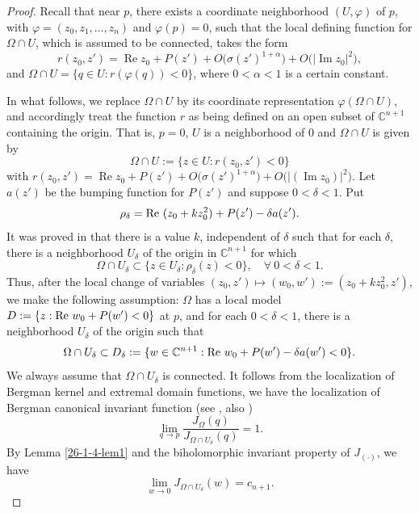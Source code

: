 \documentclass[a4paper,centertags,oneside,12pt]{amsart}
\numberwithin{equation}{section}
\begin{document}
\begin{proof}
Recall that near $p$, there exists a coordinate neighborhood $(U, \varphi)$ of $p$, with $\varphi = (z_0, z_1, \dots, z_n)$ and $\varphi(p)=0$, such that the local defining function for $\Omega \cap U$, which is assumed to be connected,  takes the form
\[
r(z_0, z') = \operatorname{Re} z_0 + P(z') + O\bigl(\sigma(z')^{1+\alpha}\bigr) + O\bigl(|\operatorname{Im} z_0|^{2}\bigr),
\]
and $\Omega \cap U = \{ q \in U : r(\varphi(q)) < 0 \}$, where $0<\alpha<1$ is a certain  constant.

In what follows, we  replace $\Omega \cap U$ by its coordinate representation $\varphi(\Omega \cap U) $, and accordingly treat the function $r$ as being defined on an open subset of $\mathbb{C}^{n+1}$ containing the origin. That is, $p=0$, $U$ is a neighborhood of $0$ and $\Omega\cap U$ is given by 
$$\Omega\cap U:=\{z\in U: r(z_0, z')<0\}$$
with $r(z_0, z') = \operatorname{Re} z_0 + P(z') + O\bigl(\sigma(z')^{1+\alpha}\bigr) + O\bigl(|(\operatorname{Im} z_0)|^{2}\bigr)$.
Let $a(z')$ be the bumping function for $P(z')$ and suppose $0<\delta<1$. Put 
$$\rho_\delta={\rm Re}~(z_0+kz_0^2)+P(z')-\delta a(z').$$
It was proved in \cite{BSY95} that there is a value $k$, independent of $\delta$ such that for each $\delta$, there is a neighborhood $U_{\delta}$ of the origin in 
$\mathbb C^{n+1}$ for which 
\begin{equation*}
    \Omega\cap U_\delta\subset\{z\in U_{\delta}: \rho_\delta(z)<0\}, \quad\forall~ 0<\delta<1.
\end{equation*}
Thus, after the local change of variables $(z_0, z')\mapsto (w_0, w'):=(z_0+kz_0^2, z')$, we make the following assumption: $\Omega$ has a local model $D:=\{z: {\rm Re}~w_0+P(w')<0\}$ at $p$, and for each $0<\delta<1$, there is a neighborhood $U_{\delta}$ of the origin such that  
\begin{equation}\label{26-1-4-b5}
\Omega\cap U_{\delta}\subset D_{\delta}:=\{w\in \mathbb C^{n+1}: {\rm Re }~w_0+P(w')-\delta a(w')<0\}.
\end{equation}
We always assume that $\Omega\cap U_{\delta}$ is connected. 
It follows from the localization of Bergman kernel and extremal domain functions, we have the localization of Bergman canonical invariant function (see \cite[Corollary 3.5]{HJL25}, also \cite[Prop 2.3 and Prop 2.4]{KYu96})
\begin{equation*}
    \lim_{q\rightarrow p}\frac{J_{\Omega}(q)}{J_{\Omega\cap U_\delta}(q)}=1.
\end{equation*}
By Lemma \ref{26-1-4-lem1} and the biholomorphic invariant property of $J_{(\cdot)}$, we have 
\begin{equation}\label{26-1-4-a5}
\lim_{w\rightarrow 0}J_{\Omega\cap U_{\delta}}(w)=c_{n+1}.
\end{equation}


\end{proof}
\end{document}
